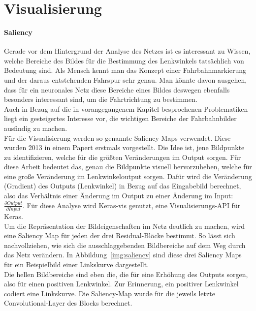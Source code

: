 \section{Visualisierung}
\paragraph{Saliency}
Gerade vor dem Hintergrund der Analyse des Netzes  ist es interessant zu Wissen, welche Bereiche des Bildes für die Bestimmung des Lenkwinkels tatsächlich von Bedeutung sind. Als Mensch kennt man das Konzept einer Fahrbahnmarkierung und der daraus entstehenden Fahrspur sehr genau. Man könnte davon ausgehen, dass für ein neuronales Netz diese Bereiche eines Bildes deswegen ebenfalls besonders interessant sind, um die Fahrtrichtung zu bestimmen.\\
Auch in Bezug auf die in vorangegangenem Kapitel besprochenen Problematiken liegt ein gesteigertes Interesse vor, die wichtigen Bereiche der Fahrbahnbilder ausfindig zu machen.\\
Für die Visualisierung werden so genannte Saliency-Maps verwendet. Diese wurden 2013 in einem Papert \cite{simonyan2013deep} erstmals vorgestellt. Die Idee ist, jene Bildpunkte zu identifizieren, welche für die größten Veränderungen im Output sorgen. Für diese Arbeit bedeutet das, genau die Bildpunkte visuell hervorzuheben, welche für eine große Veränderung im Lenkwinkeloutput sorgen. Dafür wird die Veränderung (Gradient) des Outputs (Lenkwinkel) in Bezug auf das Eingabebild berechnet, also das Verhältnis einer Änderung im Output zu einer Änderung im Input: $\frac{\partial Output}{\partial Input}$.    Für diese Analyse wird Keras-vis  genutzt, eine Visualisierungs-API für Keras.\\
Um die Repräsentation der Bildeigenschaften im Netz deutlich zu machen, wird eine Saliency Map für jeden der drei Residual-Blöcke bestimmt. So lässt sich nachvollziehen, wie sich die ausschlaggebenden Bildbereiche auf dem Weg durch das Netz verändern. In Abbildung~\ref{img:saliency} sind diese drei Saliency Maps für ein Beispielbild einer Linkskurve dargestellt.\\
Die hellen Bildbereiche sind eben die, die für eine Erhöhung des Outputs sorgen, also für einen positiven Lenkwinkel. Zur Erinnerung, ein positiver Lenkwinkel codiert eine Linkskurve. Die Saliency-Map wurde für die jeweils letzte Convolutional-Layer des Blocks berechnet.

